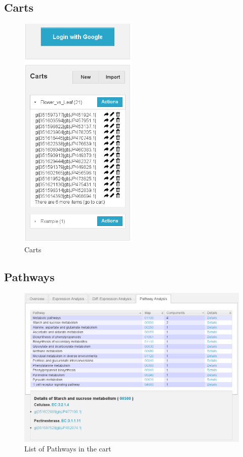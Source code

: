 \documentclass[english]{scrartcl}
\begin{document}
\subsection{Carts}
\begin{figure}
\begin{center}
  \includegraphics[width=0.5\textwidth]{figures/carts.png}
  \caption{Carts}
  \label{fig:carts}
\end{center}
\end{figure}

\subsection{Pathways}
\begin{figure}
\begin{center}
  \includegraphics[width=\textwidth]{figures/pathway.png}
  \caption{List of Pathways in the cart}
  \label{fig:pathway}
\end{center}
\end{figure}
\end{document}
